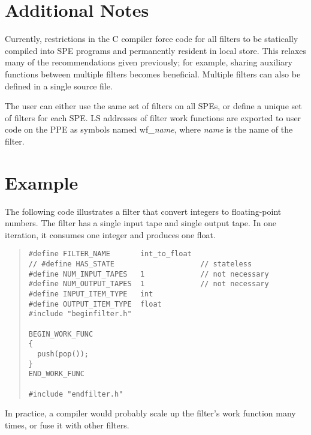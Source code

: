 \section{Additional Notes}\label{app:filterui:notes}

Currently, restrictions in the C compiler force code for all filters to be statically compiled into SPE programs and permanently resident in local store. This relaxes many of the recommendations given previously; for example, sharing auxiliary functions between multiple filters becomes beneficial. Multiple filters can also be defined in a single source file.

The user can either use the same set of filters on all SPEs, or define a unique set of filters for each SPE. LS addresses of filter work functions are exported to user code on the PPE as symbols named \textsf{wf\_\emph{name}}, where \textsf{\emph{name}} is the name of the filter.

\section{Example}

The following code illustrates a filter that convert integers to floating-point numbers. The filter has a single input tape and single output tape. In one iteration, it consumes one integer and produces one float.

\begin{quote}
\begin{verbatim}
#define FILTER_NAME       int_to_float
// #define HAS_STATE                    // stateless
#define NUM_INPUT_TAPES   1             // not necessary
#define NUM_OUTPUT_TAPES  1             // not necessary
#define INPUT_ITEM_TYPE   int
#define OUTPUT_ITEM_TYPE  float
#include "beginfilter.h"

BEGIN_WORK_FUNC
{
  push(pop());
}
END_WORK_FUNC

#include "endfilter.h"
\end{verbatim}
\end{quote}

In practice, a compiler would probably scale up the filter's work function many times, or fuse it with other filters.
